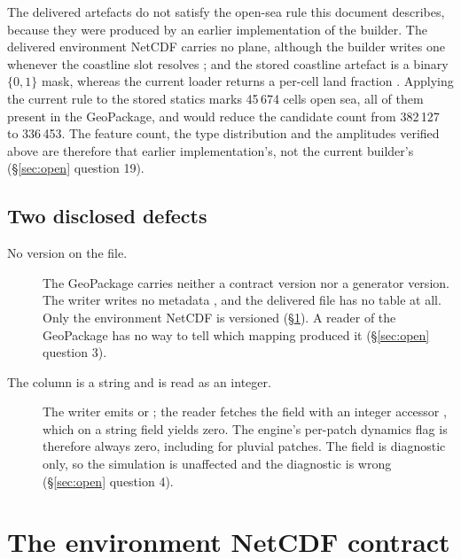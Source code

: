\documentclass[11pt,a4paper]{article} \usepackage[utf8]{inputenc} \usepackage{lmodern} \usepackage[T1]{fontenc}
\begin{document}
The delivered artefacts do not satisfy the open-sea rule this document describes, because they
were produced by an earlier implementation of the builder. The delivered environment NetCDF
carries no  plane, although the builder writes one whenever the coastline
slot resolves ; and the stored
coastline artefact  is a binary $\{0,1\}$ mask, whereas
the current loader returns a per-cell land fraction
. Applying the
current rule to the stored statics marks 45\,674 cells open sea, all of them present in the
GeoPackage, and would reduce the candidate count from 382\,127 to 336\,453. The feature count,
the type distribution and the amplitudes verified above are therefore that earlier
implementation's, not the current builder's (\S\ref{sec:open} question 19).

\subsection{Two disclosed defects}

\begin{description}
\item[No version on the file.] The GeoPackage carries neither a contract version nor a generator
version. The writer writes no metadata , and
the delivered file has no  table at all. Only the environment NetCDF is
versioned (\S\ref{sec:envnc}). A reader of the GeoPackage has no way to tell which mapping
produced it (\S\ref{sec:open} question 3). 
\item[The  column is a string and is
read as an integer.] The writer emits  or 
; the reader fetches the field with an integer
accessor , which on a string field
yields zero. The engine's per-patch dynamics flag is therefore always zero, including for
pluvial patches. The field is diagnostic only, so the simulation is unaffected and the
diagnostic is wrong (\S\ref{sec:open} question 4).
\end{description}

\section{The environment NetCDF contract} \label{sec:envnc}
\end{document}
